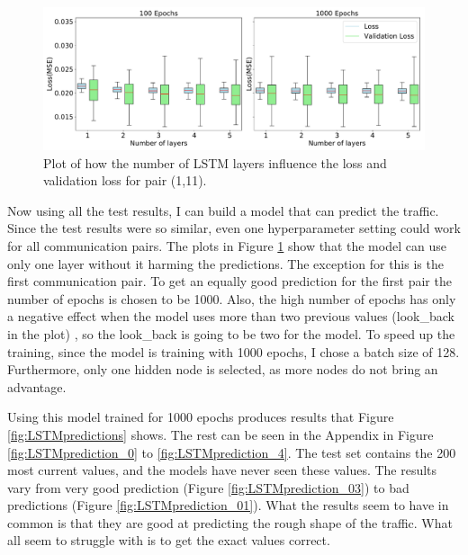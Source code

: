 \begin{figure}
	\centering
	\includegraphics[width=1\linewidth]{Pictures/Results/experiment_3_1}
	\caption{Plot of how the number of LSTM layers influence the loss and validation loss for pair (1,11).}
	\label{fig:experiment_3}
\end{figure}

Now using all the test results, I can build a model that can predict the traffic.
Since the test results were so similar, even one hyperparameter setting could work for all communication pairs.
The plots in Figure \ref{fig:experiment_3} show that the model can use only one layer without it harming the predictions.
The exception for this is the first communication pair.
To get an equally good prediction for the first pair the number of epochs is chosen to be 1000.
Also, the high number of epochs has only a negative effect when the model uses more than two previous values (look\_back in the plot) , so the look\_back is going to be two for the model.
To speed up the training, since the model is training with 1000 epochs, I chose a batch size of 128.
Furthermore, only one hidden node is selected, as more nodes do not bring an advantage.

Using this model trained for 1000 epochs produces results that Figure \ref{fig:LSTMpredictions} shows.
The rest can be seen in the Appendix in Figure \ref{fig:LSTMprediction_0} to \ref{fig:LSTMprediction_4}.
The test set contains the 200 most current values, and the models have never seen these values.
The results vary from very good prediction (Figure \ref{fig:LSTMprediction_03}) to bad predictions (Figure \ref{fig:LSTMprediction_01}).
What the results seem to have in common is that they are good at predicting the rough shape of the traffic.
What all seem to struggle with is to get the exact values correct.      

